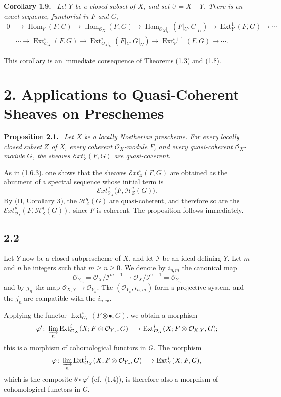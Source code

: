 \documentclass[11pt,a4paper]{article}
\newcommand{\OX}{\mathcal O_X}
\newcommand{\OY}[1]{\mathcal O_{Y_{#1}}}
\newcommand{\OXY}{\mathcal O_{X,Y}}
\newcommand{\SheafI}{\mathcal I}
\newcommand{\Ext}{\operatorname{Ext}}
\newcommand{\Homop}{\operatorname{Hom}}
\newcommand{\SheafExt}{\mathcal E\!xt}
\newcommand{\SheafH}{\mathcal H}
\newenvironment{sgastatement}[1]{\par\addvspace{0.8\baselineskip}\noindent\textbf{#1.}\ \itshape}{\par}
\begin{document}
\begin{sgastatement}{Corollary 1.9}
Let $Y$ be a closed subset of $X$, and set $U=X-Y$. There is an exact
sequence, functorial in $F$ and $G$,
\[
\begin{aligned}
 0&\longrightarrow \Homop_Y(F,G)\longrightarrow \Homop_{\OX}(F,G)
 \longrightarrow \Homop_{\OX|_U}(F|_U,G|_U)
 \longrightarrow \Ext_Y^1(F,G)\longrightarrow\cdots \\
 &\cdots\longrightarrow \Ext_{\OX}^i(F,G)
 \longrightarrow \Ext_{\OX|_U}^i(F|_U,G|_U)
 \longrightarrow \Ext_Y^{i+1}(F,G)\longrightarrow\cdots .
\end{aligned}
\]
\end{sgastatement}

This corollary is an immediate consequence of Theorems (1.3) and (1.8).

\section*{2. Applications to Quasi-Coherent Sheaves on Preschemes}

\begin{sgastatement}{Proposition 2.1}
Let $X$ be a locally Noetherian prescheme. For every locally closed subset
$Z$ of $X$, every coherent $\OX$-module $F$, and every quasi-coherent
$\OX$-module $G$, the sheaves $\SheafExt_Z^i(F,G)$ are quasi-coherent.
\end{sgastatement}

As in (1.6.3), one shows that the sheaves $\SheafExt_Z^i(F,G)$ are obtained
as the abutment of a spectral sequence whose initial term is
\[
 \SheafExt_{\OX}^p\bigl(F,\SheafH_Z^q(G)\bigr).
\]
By \textup{(II, Corollary 3)}, the $\SheafH_Z^q(G)$ are quasi-coherent, and
therefore so are the $\SheafExt_{\OX}^p(F,\SheafH_Z^q(G))$, since $F$ is
coherent. The proposition follows immediately.

\subsection*{2.2}
Let $Y$ now be a closed subprescheme of $X$, and let $\SheafI$ be an ideal
defining $Y$. Let $m$ and $n$ be integers such that $m\geq n\geq 0$. We
denote by $i_{n,m}$ the canonical map
\[
 \OY{m}=\OX/\SheafI^{m+1}\longrightarrow
 \OX/\SheafI^{n+1}=\OY{n}
\]
and by $j_n$ the map $\OXY\to\OY{n}$. The
$(\OY{n},i_{n,m})$ form a projective system, and the $j_n$ are compatible
with the $i_{n,m}$.

Applying the functor $\Ext_{\OX}^{i}(F\otimes\mathord\bullet,G)$, we obtain a
morphism
\[
 \varphi'\colon
 \varinjlim_n \Ext_{\OX}^{i}(X;F\otimes\OY{n},G)
 \longrightarrow \Ext_{\OX}^{i}(X;F\otimes\OXY,G);
\]
this is a morphism of cohomological functors in $G$. The morphism
\[
 \varphi\colon
 \varinjlim_n \Ext_{\OX}^{i}(X;F\otimes\OY{n},G)
 \longrightarrow \Ext_Y^{i}(X;F,G),
\]
which is the composite $\theta\circ\varphi'$ (cf.~(1.4)), is therefore also a
morphism of cohomological functors in $G$.
\end{document}
